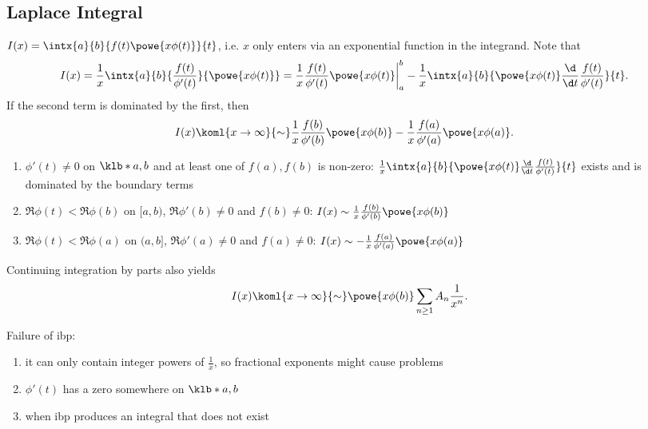 \documentclass[english, parskip=full]{scrbook}
\newcommand{\definition}[2]{\begin{tcolorbox}[colback=colorbackgrounddefinition,colframe=colordefinition, breakable,enhanced,title=\textbf{#1}.]#2\end{tcolorbox}}
\newcommand{\note}[1]{\begin{tcolorbox}[colback=colorbackgroundnote,colframe=colornote, breakable,enhanced]#1\end{tcolorbox}}
\begin{document}
\subsection{Laplace Integral}
\definition{Laplace Integral}{$I(x) = \intx{a}{b}{f(t) \powe{x\phi(t)}}{t}$, i.e. $x$ only enters via an exponential function in the integrand.
Note that
\begin{align}
I(x) &= \frac{1}{x} \intx{a}{b}{\frac{f(t)}{\phi'(t)} }{\powe{x\phi(t)}} = \frac{1}{x} \frac{f(t)}{\phi'(t)} \powe{x\phi(t)} \bigg\vert_a^b - \frac{1}{x} \intx{a}{b}{\powe{x\phi(t)} \frac{\d}{\d t} \frac{f(t)}{\phi'(t)}}{t}.
\end{align}
If the second term is dominated by the first, then
\begin{align}
I(x) &\koml{x\rightarrow\infty}{\sim} \frac{1}{x} \frac{f(b)}{\phi'(b)} \powe{x\phi(b)} - \frac{1}{x} \frac{f(a)}{\phi'(a)} \powe{x\phi(a)}.
\end{align}
\begin{enumerate}
\item $\phi'(t) \neq 0$ on $\klb*{a,b}$ and at least one of $f(a),f(b)$ is non-zero: $\frac{1}{x} \intx{a}{b}{\powe{x\phi(t)} \frac{\d}{\d t} \frac{f(t)}{\phi'(t)}}{t}$ exists and is dominated by the boundary terms
\item $\Re\phi(t) < \Re \phi(b)$ on $[a,b)$, $\Re\phi'(b) \neq 0$ and $f(b) \neq 0$: $I(x) \sim \frac{1}{x} \frac{f(b)}{\phi'(b)} \powe{x\phi(b)}$
\item $\Re\phi(t) < \Re \phi(a)$ on $(a,b]$, $\Re\phi'(a) \neq 0$ and $f(a) \neq 0$: $I(x) \sim -\frac{1}{x} \frac{f(a)}{\phi'(a)} \powe{x\phi(a)}$
\end{enumerate}
Continuing integration by parts also yields
\begin{align}
I(x) \koml{x\rightarrow\infty}{\sim} \powe{x\phi(b)} \sum_{n\ge 1} A_n \frac{1}{x^n}.
\end{align}
}
\note{Failure of \gls{ibp}:
\begin{enumerate}
\item it can only contain integer powers of $\frac{1}{x}$, so fractional exponents might cause problems
\item $\phi'(t)$ has a zero somewhere on $\klb*{a,b}$
\item when \gls{ibp} produces an integral that does not exist
\end{enumerate}
}
\end{document}

